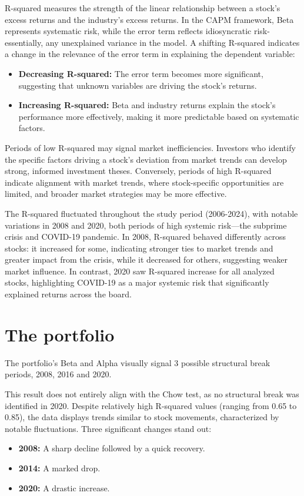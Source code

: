 R-squared measures the strength of the linear relationship between a stock's excess returns and the industry's excess returns. 
In the CAPM framework, Beta represents systematic risk, while the error term reflects idiosyncratic risk-essentially, any
unexplained variance in the model.
A shifting R-squared indicates a change in the relevance of the error term in explaining the dependent variable:

\begin{itemize}
    \item \textbf{Decreasing R-squared:} The error term becomes more significant, suggesting that unknown variables are
    driving the stock's returns.
    \item \textbf{Increasing R-squared:} Beta and industry returns explain the stock's performance more effectively, making it
    more predictable based on systematic factors.
\end{itemize}

Periods of low R-squared may signal market inefficiencies. Investors who identify the specific factors driving a stock's
deviation from market trends can develop strong, informed investment theses. 
Conversely, periods of high R-squared indicate alignment with market trends, where stock-specific opportunities are limited,
and broader market strategies may be more effective.

The R-squared fluctuated throughout the study period (2006-2024), with notable variations in 2008 and 2020, both periods of 
high systemic risk—the subprime crisis and COVID-19 pandemic.
In 2008, R-squared behaved differently across stocks: it increased for some, indicating stronger ties to market trends and
greater impact from the crisis, while it decreased for others, suggesting weaker market influence.
In contrast, 2020 saw R-squared increase for all analyzed stocks, highlighting COVID-19 as a major systemic risk that 
significantly explained returns across the board.

\section{The portfolio}
The portfolio's Beta and Alpha visually signal 3 possible structural break periods, 2008, 2016 and 2020.
 
This result does not entirely align with the Chow test, as no structural break was identified in 2020.
Despite relatively high R-squared values (ranging from 0.65 to 0.85), the data displays trends similar to stock movements, 
characterized by notable fluctuations.
Three significant changes stand out:
\begin{itemize}
    \item \textbf{2008:} A sharp decline followed by a quick recovery.
    \item \textbf{2014:} A marked drop.
    \item \textbf{2020:} A drastic increase.
\end{itemize}